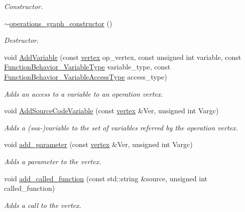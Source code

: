 \begin{DoxyCompactItemize}
\begin{DoxyCompactList}\small\item\em Constructor. \end{DoxyCompactList}\item 
\hyperlink{classoperations__graph__constructor_ae35d11d539285615f193316d83316211}{$\sim$operations\+\_\+graph\+\_\+constructor} ()
\begin{DoxyCompactList}\small\item\em Destructor. \end{DoxyCompactList}\item 
void \hyperlink{classoperations__graph__constructor_a4595ce68ba2e97a11b8c2111ff81c7c6}{Add\+Variable} (const \hyperlink{graph_8hpp_abefdcf0544e601805af44eca032cca14}{vertex} op\+\_\+vertex, const unsigned int variable, const \hyperlink{function__behavior_8hpp_aff0ab7827d49a7aca1f277e0ff126755}{Function\+Behavior\+\_\+\+Variable\+Type} variable\+\_\+type, const \hyperlink{function__behavior_8hpp_a68c28bfcfefbe63cece191e941af0409}{Function\+Behavior\+\_\+\+Variable\+Access\+Type} access\+\_\+type)
\begin{DoxyCompactList}\small\item\em Adds an access to a variable to an operation vertex. \end{DoxyCompactList}\item 
void \hyperlink{classoperations__graph__constructor_a0ce569b0781476b1dcb5527edbe30cab}{Add\+Source\+Code\+Variable} (const \hyperlink{graph_8hpp_abefdcf0544e601805af44eca032cca14}{vertex} \&Ver, unsigned int Vargc)
\begin{DoxyCompactList}\small\item\em Adds a (ssa-\/)variable to the set of variables referred by the operation vertex. \end{DoxyCompactList}\item 
void \hyperlink{classoperations__graph__constructor_a6a9d4382007a564b44ffb809db3a557a}{add\+\_\+parameter} (const \hyperlink{graph_8hpp_abefdcf0544e601805af44eca032cca14}{vertex} \&Ver, unsigned int Vargc)
\begin{DoxyCompactList}\small\item\em Adds a parameter to the vertex. \end{DoxyCompactList}\item 
void \hyperlink{classoperations__graph__constructor_ac5826ccd6edc3ddb2ba4d1a5e695f809}{add\+\_\+called\+\_\+function} (const std\+::string \&source, unsigned int called\+\_\+function)
\begin{DoxyCompactList}\small\item\em Adds a call to the vertex. \end{DoxyCompactList}\end{DoxyCompactItemize}
